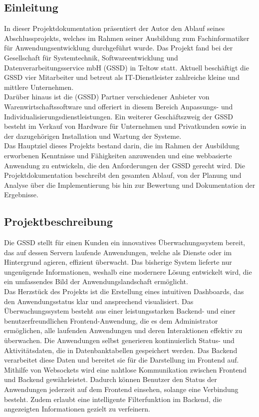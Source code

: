 \begin{flushleft}
	\setcounter{page}{1}
	\section{Einleitung}
	In dieser Projektdokumentation präsentiert der Autor den Ablauf seines Abschlussprojekts, welches im Rahmen seiner Ausbildung zum Fachinformatiker für Anwendungsentwicklung durchgeführt wurde. Das Projekt fand bei der Gesellschaft für Systemtechnik, Softwareentwicklung und Datenverarbeitungsservice mbH (\acs{GSSD}) in Teltow statt. Aktuell beschäftigt die \acs{GSSD} vier Mitarbeiter und betreut als IT-Dienstleister zahlreiche kleine und mittlere Unternehmen.
	\\
	Darüber hinaus ist die (\acs{GSSD}) Partner verschiedener Anbieter von Warenwirtschaftssoftware und offeriert in diesem Bereich Anpassungs- und Individualisierungsdienstleistungen. Ein weiterer Geschäftszweig der \acs{GSSD} besteht im Verkauf von Hardware für Unternehmen und Privatkunden sowie in der dazugehörigen Installation und Wartung der Systeme.
	\\
	Das Hauptziel dieses Projekts bestand darin, die im Rahmen der Ausbildung erworbenen Kenntnisse und Fähigkeiten anzuwenden und eine webbasierte Anwendung zu entwickeln, die den Anforderungen der \acs{GSSD} gerecht wird. Die Projektdokumentation beschreibt den gesamten Ablauf, von der Planung und Analyse über die Implementierung bis hin zur Bewertung und Dokumentation der Ergebnisse.

	\subsection{Projektbeschreibung}
	Die \acs{GSSD} stellt für einen Kunden ein innovatives Überwachungssystem bereit, das auf dessen Servern laufende Anwendungen, welche als Dienste oder im Hintergrund agieren, effizient überwacht. Das bisherige System lieferte nur ungenügende Informationen, weshalb eine modernere Lösung entwickelt wird, die ein umfassendes Bild der Anwendungslandschaft ermöglicht.
	\\
	Das Herzstück des Projekts ist die Erstellung eines intuitiven Dashboards, das den Anwendungsstatus klar und ansprechend visualisiert. Das Überwachungssystem besteht aus einer leistungsstarken Backend- und einer benutzerfreundlichen Frontend-Anwendung, die es dem Administrator ermöglichen, alle laufenden Anwendungen und deren Interaktionen effektiv zu überwachen. Die Anwendungen selbst generieren kontinuierlich Status- und Aktivitätsdaten, die in Datenbanktabellen gespeichert werden. Das Backend verarbeitet diese Daten und bereitet sie für die Darstellung im Frontend auf.
	\\
	Mithilfe von Websockets wird eine nahtlose Kommunikation zwischen Frontend und Backend gewährleistet. Dadurch können Benutzer den Status der Anwendungen jederzeit auf dem Frontend einsehen, solange eine Verbindung besteht. Zudem erlaubt eine intelligente Filterfunktion im Backend, die angezeigten Informationen gezielt zu verfeinern.

\end{flushleft}
